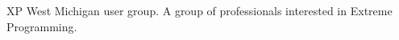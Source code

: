 \documentclass[ComputerScience]{vita}
\begin{document}
\begin{vita}
\begin{Memberships}
\item XP West Michigan user group.  A group of professionals interested in Extreme Programming.

\end{Memberships}








\end{vita}
\end{document}
